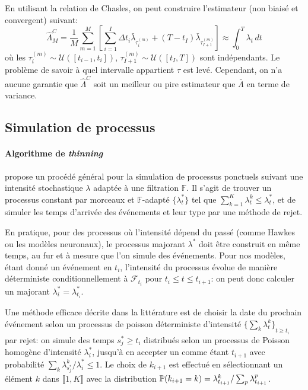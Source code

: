 \documentclass[../main.tex]{subfiles}
\begin{document}
En utilisant la relation de Chasles, on peut construire l'estimateur (non biaisé et convergent) suivant:
\begin{equation}
\hat{\Lambda}_M^C = \frac{1}{M}\sum_{m=1}^{M}\left[ \sum_{i=1}^{I} \Delta t_i \bar\lambda_{\tau^{(m)}_i} + (T-t_{I}) \bar\lambda_{\tau^{(m)}_{I+1}}\right]
\approx
\int_0^T \lambda_t\,dt
\end{equation}
où les $\tau_i^{(m)}\sim\mathcal{U}([t_{i-1}, t_i])$, $\tau_{I+1}^{(m)}\sim\mathcal{U}([t_I, T])$ sont indépendants. Le problème de savoir à quel intervalle appartient $\tau$ est levé. Cependant, on n'a aucune garantie que $\hat{\Lambda}^C$ soit un meilleur ou pire estimateur que $\bar{\Lambda}$ en terme de variance.

\subsection{Simulation de processus}

\paragraph{Algorithme de \textit{thinning}} \citeauthor{ogata1981} propose un procédé général pour la simulation de processus ponctuels suivant une intensité stochastique $\lambda$ adaptée à une filtration $\mathds{F}$. Il s'agit de trouver un processus constant par morceaux et $\mathds{F}$-adapté $\{\lambda_t^*\}$ tel que $\sum_{k=1}^{K}\lambda^k_t \leq \lambda_t^*$, et de simuler les temps d'arrivée des événements et leur type par une méthode de rejet. \autocite{ogata1981}

En pratique, pour des processus où l'intensité dépend du passé (comme Hawkes ou les modèles neuronaux), le processus majorant $\lambda^*$ doit être construit en même temps, au fur et à mesure que l'on simule des événements. Pour nos modèles, étant donné un événement en $t_i$, l'intensité du processus évolue de manière déterministe conditionnellement à $\mathcal{F}_{t_i}$ pour $t_i\leq t\leq t_{i+1}$: on peut donc calculer un majorant $\lambda_i^* = \lambda^*_{t_i}$.

Une méthode efficace décrite dans la littérature est de choisir la date du prochain événement selon un processus de poisson déterministe d'intensité ${\{\sum_k\lambda^k_t\}}_{t\geq t_i}$ par rejet: on simule des temps $s_j^*\geq t_i$ distribués selon un processus de Poisson homogène d'intensité $\lambda_i^*$, jusqu'à en accepter un comme étant $t_{i+1}$ avec probabilité $\sum_k\lambda^k_{s_j^*}/\lambda^*_{i} \leq 1$. Le choix de $k_{i+1}$ est effectué en sélectionnant un élément $k$ dans $\llbracket 1,K\rrbracket$ avec la distribution $\mathbb{P}(k_{i+1} = k) = \lambda^{k}_{t_{i+1}}/\sum_p \lambda^p_{t_{i+1}}$. \cite{meiEisnerNeuralHawkes,ogata1981}
\end{document}
